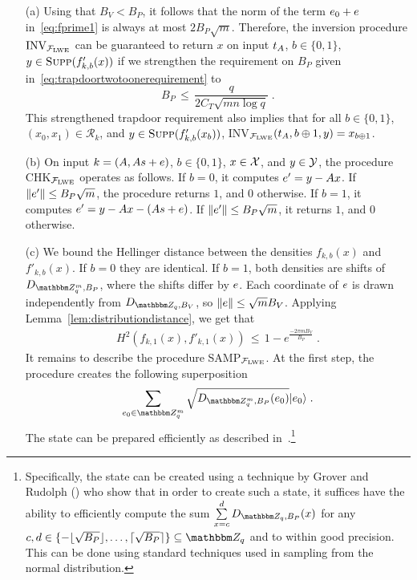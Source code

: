 \begin{enumerate}
\item[(a)] Using that $B_V < B_P$, it follows that the norm of the term $\*e_0 + \*e$ in~\eqref{eq:fprime1} is always at most $2B_P\sqrt{m}$. Therefore, the inversion procedure $\textrm{INV}_{\mathcal{F}_{\mathrm{LWE}}}$ can be guaranteed to return $x$ on input $t_{\*A}$, $b\in \{0,1\}$, $y\in \textsc{Supp}(f'_{k,b}(x))$ if we strengthen the requirement on $B_P$ given in~\eqref{eq:trapdoortwotoonerequirement} to
\begin{equation}\label{eq:superpositiontrapdoorrequirement}
    B_P \,\leq\, \frac{q}{2C_T\sqrt{mn\log q}}\;.
\end{equation}
This strengthened trapdoor requirement also implies that for all $b\in \{0,1\}$, $(x_0,x_1)\in\mathcal{R}_k$, and $y\in \textsc{Supp}(f'_{k,b}(x_b))$, INV$_{\mathcal{F}_{\lwe}}(t_{\*A},b\oplus 1,y) = x_{b\oplus 1}$. 
\item[(b)] On input $k = (\*A,\*A\*s + \*e)$, $b\in\{0,1\}$, $x \in \mathcal{X}$, and $y\in\mathcal{Y}$, the procedure CHK$_{\mathcal{F}_{\mathrm{LWE}}}$ operates as follows. If $b=0$, it computes $\*e' = y - \*Ax$. If $\|\*e'\| \leq B_P\sqrt{m}$, the procedure returns $1$, and $0$ otherwise. If $b = 1$, it computes $\*e' = y - \*Ax - (\*A\*s + \*e)$. If $\|\*e'\| \leq B_P\sqrt{m}$, it returns $1$, and $0$ otherwise. 

\item[(c)] 
We bound the Hellinger distance between the densities $f_{k,b}(x)$ and $f'_{k,b}(x)$. If $b=0$ they are identical. If $b=1$, both densities are shifts of $D_{\mZ_q^m,B_P}$, where the shifts differ by $\*e$. Each coordinate of $\*e$ is drawn independently from $D_{\mZ_q,B_V}$, so $\|\*e\|\leq \sqrt{m}B_V$. Applying Lemma~\ref{lem:distributiondistance}, we get that 
\begin{eqnarray*}
H^2(f_{k,1}(x),f'_{k,1}(x))\,\leq \, 1 - e^{\frac{-2\pi mB_V}{B_P}}\;.
\end{eqnarray*}
It remains to describe the  procedure SAMP$_{\mathcal{F}_{\mathrm{LWE}}}$. At the first step, the procedure creates the following superposition
\begin{equation}\label{eq:discretesup}
\sum_{\*e_0\in \mZ_q^m} \sqrt{D_{\mZ_q^m,B_P}(\*e_0)}\ket{\*e_0}\;.
\end{equation}
The state can be prepared efficiently as described in~\cite[Lemma 3.12]{regev2005}.\footnote{Specifically, the state can be created using a technique by Grover and Rudolph (\cite{distributionsuperpositions}) who show that in order to create such a state, it suffices have the ability to efficiently compute the sum $\sum\limits_{x=c}^d D_{\mZ_q,B_P}(x)$  for any $c,d\in\{-\lfloor\sqrt{B_P}\rfloor,\ldots,\lceil\sqrt{B_P}\rceil\}\subseteq \mZ_q$  and to within good precision. This can be done using standard techniques used in sampling from the normal distribution.}


\end{enumerate}
